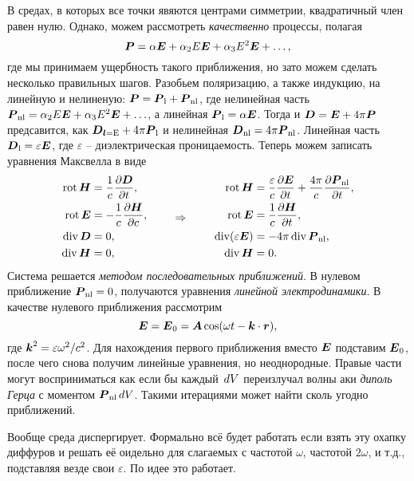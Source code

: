 В средах, в которых все точки явяются центрами симметрии, квадратичный член равен нулю. Однако, можем рассмотреть \textit{качественно} процессы, полагая
\begin{equation*}
    \mbox{\boldmath $P$} = \alpha \mbox{\boldmath $E$} + \alpha_2 E \mbox{\boldmath $E$} + \alpha_3 E^2 \mbox{\boldmath $E$} + \ldots,
\end{equation*}
где мы принимаем ущербность такого приближения, но зато можем сделать несколько правильных шагов. Разобьем поляризацию, а также индукцию, на линейную и нелиненую: $\mbox{\boldmath $P$} = \mbox{\boldmath $P$}_{\textnormal{l}}+\mbox{\boldmath $P$}_{\textnormal{nl}}$, где нелинейная часть $\mbox{\boldmath $P$}_{\textnormal{nl}} = \alpha_2 E \mbox{\boldmath $E$} + \alpha_3 E^2 \mbox{\boldmath $E$} + \ldots$, а линейная $\mbox{\boldmath $P$}_{\textnormal{l}} = \alpha \mbox{\boldmath $E$}$. Тогда и $\mbox{\boldmath $D$} = \mbox{\boldmath $E$} + 4 \pi \mbox{\boldmath $P$}$ предсавится, как $\mbox{\boldmath $D$}_{\textnormal{\mbox{\boldmath $l$}=E}}+4 \pi \mbox{\boldmath $P$}_{\textnormal{l}}$ и нелинейная $\mbox{\boldmath $D$}_{\textnormal{nl}}=4 \pi \mbox{\boldmath $P$}_{\textnormal{nl}}$. Линейная часть $\mbox{\boldmath $D$}_{\textnormal{l}}=\varepsilon \mbox{\boldmath $E$}$, где $\varepsilon$ -- диэлектрическая проницаемость. Теперь можем записать уравнения Максвелла в виде
\begin{equation*}
\left.\begin{aligned}
    \mathop{\mathrm{rot}}\nolimits \mbox{\boldmath $H$} &= \frac{1}{c} \frac{\partial \mbox{\boldmath $D$}}{\partial t}, \\
    \mathop{\mathrm{rot}}\nolimits \mbox{\boldmath $E$} &= - \frac{1}{c} \frac{\partial \mbox{\boldmath $H$}}{\partial c}, \\
    \mathop{\mathrm{div}}\nolimits \mbox{\boldmath $D$} &= 0, \\
    \mathop{\mathrm{div}}\nolimits \mbox{\boldmath $H$} &= 0, \\
\end{aligned}\right.
\hspace{0.75cm} \Rightarrow \hspace{0.75cm}
\left.\begin{aligned}
            \mathop{\mathrm{rot}}\nolimits \mbox{\boldmath $H$}  &=  \frac{\varepsilon}{c} \frac{\partial \mbox{\boldmath $E$}}{\partial t} + \frac{4 \pi}{c} \frac{\partial \mbox{\boldmath $P$}_{\textnormal{nl}}}{\partial t} , \\
    \mathop{\mathrm{rot}}\nolimits \mbox{\boldmath $E$}  &=  \frac{1}{c} \frac{\partial \mbox{\boldmath $H$}}{\partial t}, \\
    \mathop{\mathrm{div}}\nolimits(\varepsilon \mbox{\boldmath $E$}) &= - 4\pi \mathop{\mathrm{div}}\nolimits \mbox{\boldmath $P$}_{\textnormal{nl}}, \\
    \mathop{\mathrm{div}}\nolimits \mbox{\boldmath $H$} &= 0.
    \end{aligned}\right.    
\end{equation*}
Система решается \textit{методом последовательных приближений}. В нулевом приближение $\mbox{\boldmath $P$}_{\textnormal{nl}}=0$, получаются уравнения \textit{линейной электродинамики}. В качестве нулевого приближения рассмотрим
\begin{equation*}
    \mbox{\boldmath $E$} = \mbox{\boldmath $E$}_0 = \mbox{\boldmath $A$} \cos(\omega t - \mbox{\boldmath $k$} \cdot \mbox{\boldmath $r$}),
\end{equation*}
где $\mbox{\boldmath $k$}^2 = \varepsilon \omega^2/c^2$. Для нахождения первого приближения вместо $\mbox{\boldmath $E$}$ подставим $\mbox{\boldmath $E$}_0$, после чего снова получим линейные уравнения, но неоднородные. Правые части могут восприниматься как если бы каждый $\, d V$ переизлучал волны аки \textit{диполь Герца} с моментом $\mbox{\boldmath $P$}_{\textnormal{nl}} \, d V$. Такими итерациями может найти сколь угодно приближений. 


Вообще среда диспергирует. Формально всё будет работать если взять эту охапку диффуров и решать её оидельно для слагаемых с частотой $\omega$, частотой $2\omega$, и т.д., подставляя везде свои $\varepsilon$. По идее это работает. 